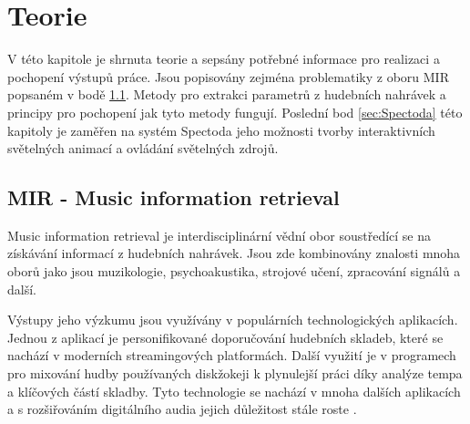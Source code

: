 \chapter{Teorie} \label{sec:Teorie}

V této kapitole je shrnuta teorie a sepsány potřebné informace pro realizaci a pochopení výstupů práce. Jsou popisovány zejména problematiky z oboru \acs{MIR} popsaném v bodě \ref{sec:MIR}. Metody pro extrakci parametrů z hudebních nahrávek a principy pro pochopení jak tyto metody fungují. Poslední bod \ref{sec:Spectoda} této kapitoly je zaměřen na systém Spectoda jeho možnosti tvorby interaktivních světelných animací a ovládání světelných zdrojů. 

\section{MIR - Music information retrieval} \label{sec:MIR}
    Music information retrieval je interdisciplinární vědní obor soustředící se na získávání informací z hudebních nahrávek.
    Jsou zde kombinovány znalosti mnoha oborů jako jsou muzikologie, psychoakustika, strojové učení, zpracování signálů a další. 
    
    Výstupy jeho výzkumu jsou využívány v populárních technologických aplikacích. 
    Jednou z aplikací je personifikované doporučování hudebních skladeb, které se nachází v moderních streamingových platformách.
    Další využití je v programech pro mixování hudby používaných diskžokeji k plynulejší práci díky analýze tempa a klíčových částí skladby.
    Tyto technologie se nachází v mnoha dalších aplikacích a s rozšiřováním digitálního audia jejich důležitost stále roste \cite{Content_based_MIR}.
    
